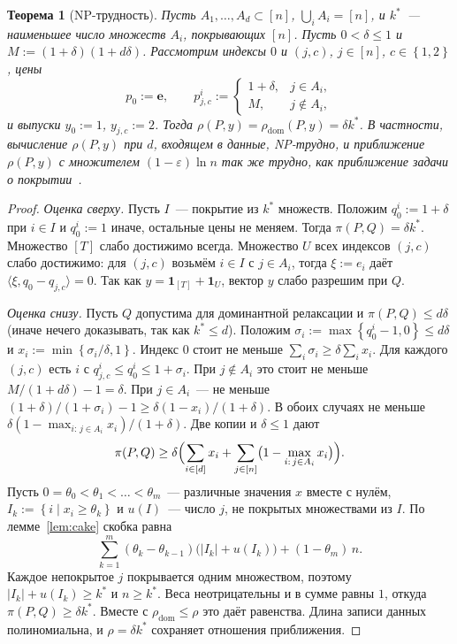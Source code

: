 \documentclass[a4paper,11pt]{article}
\theoremstyle{plain}
\newtheorem{theorem}{Теорема}[section]
\theoremstyle{definition}
\theoremstyle{remark}
\newcommand{\abs}[1]{\left\lvert #1 \right\rvert}
\newcommand{\set}[1]{\left\{ #1 \right\}}
\newcommand{\ip}[2]{\langle #1, #2\rangle} %
\begin{document}
\begin{theorem}[NP-трудность]\label{thm:hard}
    Пусть $A_1,\dots,A_d\subset[n]$, $\bigcup_iA_i=[n]$, и $k^*$~--- наименьшее число множеств $A_i$, покрывающих $[n]$. Пусть $0<\delta\le1$ и $M:=(1+\delta)(1+d\delta)$. Рассмотрим индексы $0$ и $(j,c)$, $j\in[n]$, $c\in\set{1,2}$, цены
    \[
        p_0:=\mathbf e,\qquad p^i_{j,c}:=\begin{cases}1+\delta,& j\in A_i,\\ M,& j\notin A_i,\end{cases}
    \]
    и выпуски $y_0:=1$, $y_{j,c}:=2$. Тогда $\rho(P,y)=\rho_{\mathrm{dom}}(P,y)=\delta k^*$. В частности, вычисление $\rho(P,y)$ при $d$, входящем в данные, NP-трудно, и приближение $\rho(P,y)$ с множителем $(1-\varepsilon)\ln n$ так же трудно, как приближение задачи о покрытии~\cite{Feige}.
\end{theorem}

\begin{proof}
    \emph{Оценка сверху.} Пусть $I$~--- покрытие из $k^*$ множеств. Положим $q^i_0:=1+\delta$ при $i\in I$ и $q^i_0:=1$ иначе, остальные цены не меняем. Тогда $\pi(P,Q)=\delta k^*$. Множество $[T]$ слабо достижимо всегда. Множество $U$ всех индексов $(j,c)$ слабо достижимо: для $(j,c)$ возьмём $i\in I$ с $j\in A_i$, тогда $\xi:=e_i$ даёт $\ip{\xi}{q_0-q_{j,c}}=0$. Так как $y=\mathbf 1_{[T]}+\mathbf 1_U$, вектор $y$ слабо разрешим при $Q$.

    \emph{Оценка снизу.} Пусть $Q$ допустима для доминантной релаксации и $\pi(P,Q)\le d\delta$ (иначе нечего доказывать, так как $k^*\le d$). Положим $\sigma_i:=\max\set{q^i_0-1,0}\le d\delta$ и $x_i:=\min\set{\sigma_i/\delta,1}$. Индекс $0$ стоит не меньше $\sum_i\sigma_i\ge\delta\sum_ix_i$. Для каждого $(j,c)$ есть $i$ с $q^i_{j,c}\le q^i_0\le1+\sigma_i$. При $j\notin A_i$ это стоит не меньше $M/(1+d\delta)-1=\delta$. При $j\in A_i$~--- не меньше $(1+\delta)/(1+\sigma_i)-1\ge\delta(1-x_i)/(1+\delta)$. В обоих случаях не меньше $\delta(1-\max_{i:\,j\in A_i}x_i)/(1+\delta)$. Две копии и $\delta\le1$ дают
    \[
        \pi(P,Q)\ge\delta\Bigl(\sum_{i\in[d]}x_i+\sum_{j\in[n]}\bigl(1-\max_{i:\,j\in A_i}x_i\bigr)\Bigr).
    \]
    Пусть $0=\theta_0<\theta_1<\dots<\theta_m$~--- различные значения $x$ вместе с нулём, $I_k:=\set{i\mid x_i\ge\theta_k}$ и $u(I)$~--- число $j$, не покрытых множествами из $I$. По лемме~\ref{lem:cake} скобка равна
    \[
        \sum_{k=1}^m(\theta_k-\theta_{k-1})\bigl(\abs{I_k}+u(I_k)\bigr)+(1-\theta_m)\,n.
    \]
    Каждое непокрытое $j$ покрывается одним множеством, поэтому $\abs{I_k}+u(I_k)\ge k^*$ и $n\ge k^*$. Веса неотрицательны и в сумме равны $1$, откуда $\pi(P,Q)\ge\delta k^*$. Вместе с $\rho_{\mathrm{dom}}\le\rho$ это даёт равенства. Длина записи данных полиномиальна, и $\rho=\delta k^*$ сохраняет отношения приближения.
\end{proof}
\end{document}
